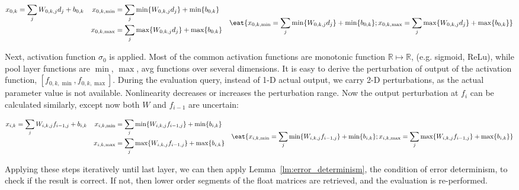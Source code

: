 \documentclass[conference]{IEEEtran}
\begin{document}
{\small{
\begin{displaymath}
\begin{aligned}
x_{0,k} &= \sum_j W_{0,k,j} d_j + b_{0,k} & 
x_{0,k,\min} &= \sum_j \min\{W_{0,k,j} d_j\} + \min\{ b_{0,k} \} &\\
& & x_{0,k,\max} &= \sum_j \max\{W_{0,k,j} d_j\} + \max\{ b_{0,k} \} & \\
\end{aligned}
\eat{
x_{0,k,\min} = \sum_j \min\{W_{0,k,j} d_j\} + \min\{ b_{0,k} \}; 
x_{0,k,\max} = \sum_j \max\{W_{0,k,j} d_j\} + \max\{ b_{0,k} \} 
}
\end{displaymath}
}}

{\noindent}Next, activation function $\sigma_0$ is applied. Most of the common activation functions are monotonic function $\mathbb{R}\mapsto\mathbb{R}$, (e.g. sigmoid, ReLu), while pool layer functions are $\min$, $\max$, avg functions over several dimensions. It is easy to derive the perturbation of output of the activation function, $[f_{0,k,\min}, f_{0,k,\max}]$. During the evaluation query, instead of 1-D actual output, we carry 2-D perturbations, as the actual parameter value is not available. Nonlinearity decreases or increases the perturbation range. Now the output perturbation at $f_i$ can be calculated similarly, except now both $W$ and $f_{i-1}$ are uncertain:

{\small{
\begin{displaymath}
\begin{aligned}
x_{i,k} &= \sum_j W_{i,k,j} f_{i-1,j} + b_{i,k} & 
x_{i,k,\min} &= \sum_j \min\{W_{i,k,j} f_{i-1,j}\} + \min\{ b_{i,k} \} &\\
& & x_{i,k,\max} &= \sum_j \max\{W_{i,k,j} f_{i-1,j}\} + \max\{ b_{i,k} \} & \\
\end{aligned}
\eat{
x_{i,k,\min} = \sum_j \min\{W_{i,k,j} f_{i-1,j}\} + \min\{ b_{i,k} \}; 
x_{i,k,\max} = \sum_j \max\{W_{i,k,j} f_{i-1,j}\} + \max\{ b_{i,k} \} 
}
\end{displaymath}
}}

{\noindent}Applying these steps iteratively until last layer,  we can then apply Lemma~\ref{lm:error_determinism}, the condition of error determinism, to check if the result is correct. If not, then lower order segments of the float matrices are retrieved, and the evaluation is re-performed.
\end{document}
